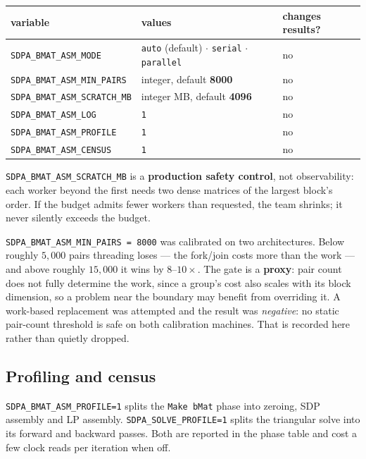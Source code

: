\documentclass[11pt]{article}
\newcommand{\code}[1]{\texttt{#1}}
\begin{document}
\begin{center}\small
\begin{tabular}{@{}p{5.1cm}p{5.6cm}l@{}}
\toprule
variable & values & changes results? \\
\midrule
\code{SDPA\_BMAT\_ASM\_MODE} & \code{auto} (default) $\cdot$ \code{serial} $\cdot$ \code{parallel} & no \\
\code{SDPA\_BMAT\_ASM\_MIN\_PAIRS} & integer, default \textbf{8000} & no \\
\code{SDPA\_BMAT\_ASM\_SCRATCH\_MB} & integer MB, default \textbf{4096} & no \\
\code{SDPA\_BMAT\_ASM\_LOG} & \code{1} & no \\
\code{SDPA\_BMAT\_ASM\_PROFILE} & \code{1} & no \\
\code{SDPA\_BMAT\_ASM\_CENSUS} & \code{1} & no \\
\bottomrule
\end{tabular}
\end{center}

\code{SDPA\_BMAT\_ASM\_SCRATCH\_MB} is a \textbf{production safety control}, not observability: each
worker beyond the first needs two dense matrices of the largest block's order. If the budget admits
fewer workers than requested, the team shrinks; it never silently exceeds the budget.

\code{SDPA\_BMAT\_ASM\_MIN\_PAIRS = 8000} was calibrated on two architectures. Below roughly
$5{,}000$ pairs threading loses --- the fork/join costs more than the work --- and above roughly
$15{,}000$ it wins by $8$--$10\times$. The gate is a \textbf{proxy}: pair count does not fully
determine the work, since a group's cost also scales with its block dimension, so a problem near the
boundary may benefit from overriding it. A work-based replacement was attempted and the result was
\emph{negative}: no static pair-count threshold is safe on both calibration machines. That is
recorded here rather than quietly dropped.

\subsection{Profiling and census}

\code{SDPA\_BMAT\_ASM\_PROFILE=1} splits the \code{Make bMat} phase into zeroing, SDP assembly and
LP assembly. \code{SDPA\_SOLVE\_PROFILE=1} splits the triangular solve into its forward and backward
passes. Both are reported in the phase table and cost a few clock reads per iteration when off.
\end{document}
